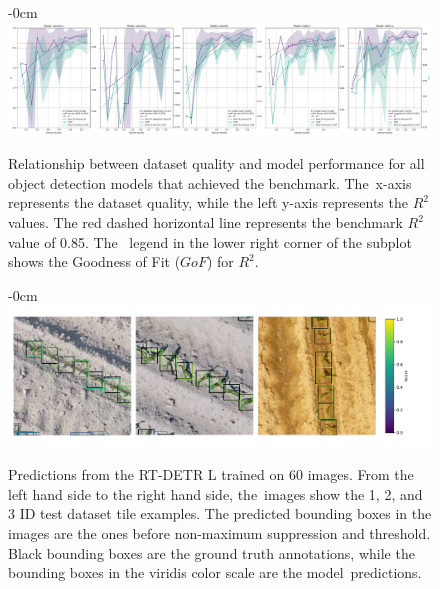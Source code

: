 \documentclass[12pt,a4paper,oneside]{report}
\newlength{\extralength}
\begin{document}
\begin{figure}[H]
  
  \begin{adjustwidth}{-\extralength}{0cm}
  \centering
  \includegraphics[width=17cm]{Plots/r2_ap_vs_dataset_quality.pdf}
 
  \end{adjustwidth}   
   \caption{Relationship between dataset quality and model performance for all object detection models
  that achieved the benchmark. The~x-axis represents the dataset quality, while 
  the left y-axis represents the $R^2$ values.
  The red dashed horizontal line represents the benchmark $R^2$ value of 0.85. The~  legend in the lower right corner of the subplot shows the Goodness of Fit ($GoF$) for $R^2$.}
  \label{fig:dataset_quality}
\end{figure}

\vspace{-18pt}


\begin{figure}[H]

  \begin{adjustwidth}{-\extralength}{0cm}
  \centering
  \includegraphics[width=16cm]{Plots/many_shot_size_annotations.pdf}
  \end{adjustwidth}
  \vspace{-12pt}\caption{Predictions from the RT-DETR L trained on 60 images.
  From the left hand side to the right hand side, the~images show the
  1, 2, and 3 ID test dataset tile examples.
  The predicted bounding boxes in the images are the ones before 
  non-maximum suppression and threshold.
   Black bounding boxes are the ground truth annotations, while the bounding boxes 
   in the viridis color scale are the model~predictions.}
  \label{fig:annotations_many-shots_size}

\end{figure}
\unskip
\end{document}
